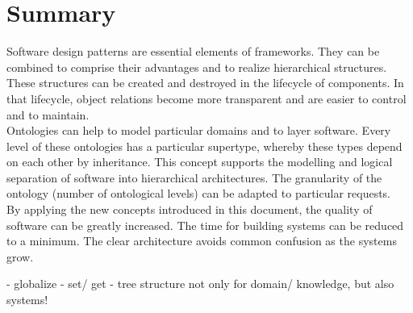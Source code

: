 %
%
%
%
%
%
%

\section{Summary}
\label{summary_heading}

Software design patterns are essential elements of frameworks. They can be
combined to comprise their advantages and to realize hierarchical structures.
These structures can be created and destroyed in the lifecycle of components.
In that lifecycle, object relations become more transparent and are easier to
control and to maintain.\\
Ontologies can help to model particular domains and to layer software. Every level
of these ontologies has a particular supertype, whereby these types depend on each
other by inheritance. This concept supports the modelling and logical separation
of software into hierarchical architectures. The granularity of the ontology
(number of ontological levels) can be adapted to particular requests.\\
By applying the new concepts introduced in this document, the quality of software
can be greatly increased. The time for building systems can be reduced to a minimum.
The clear architecture avoids common confusion as the systems grow.

- globalize
- set/ get
- tree structure not only for domain/ knowledge, but also systems!

